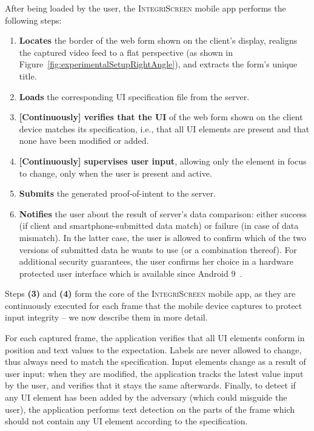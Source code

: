 \documentclass[sigconf, anonymous, balance=false]{acmart}
\newcommand{\POI}{proof-of-intent\xspace}
\newcommand{\myparagraph}[1]{\myparagraphnodot{#1.}}
\newcommand{\myparagraphnodot}[1]{\vspace{4pt} \noindent {\bfseries #1}\xspace}
\newcommand{\md}{smartphone\xspace}
\newcommand{\sysname}{\textsc{IntegriScreen}\xspace}
\newcommand{\name}{\sysname}
\begin{document}
After being loaded by the user, the \sysname mobile app performs the following steps:
\begin{enumerate}%
    \item \textbf{Locates} the border of the web form shown on the client's display, realigns the captured video feed to a flat perspective (as shown in Figure~\ref{fig:experimentalSetupRightAngle}), and extracts the form's unique title.
    \item \textbf{Loads} the corresponding UI specification file from the server.
    \item \textbf{[Continuously] verifies that the UI} of the web form shown on the client device matches its specification, i.e., that all UI elements are present and that none have been modified or added.
    \item \textbf{[Continuously] supervises user input}, allowing only the element in focus to change, only when the user is present and active.
	\item \textbf{Submits} the generated \POI to the server.
    \item \textbf{Notifies} the user about the result of server's data comparison: either success (if client and \md -submitted data match) or failure (in case of data mismatch).
    In the latter case, the user is allowed to confirm which of the two versions of submitted data he wants to use (or a combination thereof).
    For additional security guarantees, the user confirms her choice in a hardware protected user interface which is available since Android 9~\cite{androidConfirmation}.
\end{enumerate}

Steps \textbf{(3)} and \textbf{(4)} form the core of the \name mobile app, as they are continuously executed for each frame that the mobile device captures to protect input integrity -- we now describe them in more detail.


\myparagraph{(3) Continuous UI Verification}
For each captured frame, the application verifies that all UI elements conform in position and text values to the expectation.
Labels are never allowed to change, thus always need to match the specification.
Input elements change as a result of user input: when they are modified, the application tracks the latest value input by the user, and verifies that it stays the same afterwards.
Finally, to detect if any UI element has been added by the adversary (which could misguide the user), the application performs text detection on the parts of the frame which should not contain any UI element according to the specification.
\end{document}

